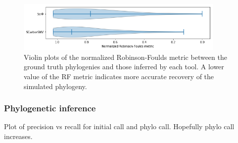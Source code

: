 \documentclass[../../main.tex]{subfiles}
\begin{document}
\begin{figure}[h] 
    \includegraphics[width=0.9\textwidth]{sections/graphics/RFviolinplots}
    \caption{Violin plots of the normalized Robinson-Foulds metric between the ground truth phylogenies and those inferred by each tool.
    A lower value of the RF metric indicates more accurate recovery of the simulated phylogeny.}
    \label{fig:RFviol}
\end{figure}

\subsubsection*{Phylogenetic inference}
Plot of precision vs recall for initial call and phylo call. Hopefully phylo call increases.
\end{document}
